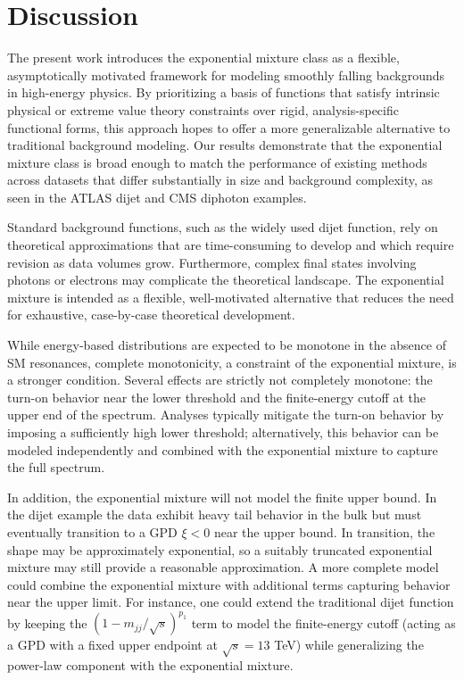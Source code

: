 \documentclass[a4paper,11pt]{article}
\begin{document}
\section{Discussion} \label{sec:discussion}

The present work introduces the exponential mixture class as a flexible, asymptotically motivated framework for modeling smoothly falling backgrounds in high-energy physics. By prioritizing a basis of functions that satisfy intrinsic physical or extreme value theory constraints over rigid, analysis-specific functional forms, this approach hopes to offer a more generalizable alternative to traditional background modeling. Our results demonstrate that the exponential mixture class is broad enough to match the performance of existing methods across datasets that differ substantially in size and background complexity, as seen in the ATLAS dijet and CMS diphoton examples.

Standard background functions, such as the widely used dijet function, rely on theoretical approximations that are time-consuming to develop and which require revision as data volumes grow. Furthermore, complex final states involving photons or electrons may complicate the theoretical landscape. The exponential mixture is intended as a flexible, well-motivated alternative that reduces the need for exhaustive, case-by-case theoretical development.

While energy-based distributions are expected to be monotone in the absence of SM resonances, complete monotonicity, a constraint of the exponential mixture, is a stronger condition.
Several effects are strictly not completely monotone: the turn-on behavior near the lower 
threshold and the finite-energy cutoff at the upper end of the spectrum.
Analyses typically mitigate the turn-on behavior by imposing a sufficiently high lower 
threshold; alternatively, this behavior can be modeled independently and combined with the 
exponential mixture to capture the full spectrum. 

In addition, the exponential mixture will not model the finite upper bound. In the dijet example the data exhibit heavy tail behavior in the bulk but must eventually transition to a GPD $\xi<0$ near the upper bound. In transition, the shape may be approximately exponential, so a suitably truncated exponential 
mixture may still provide a reasonable approximation.
A more complete model could combine the exponential mixture with additional terms capturing 
behavior near the upper limit. For instance, one could extend the traditional dijet function by keeping the $(1-m_{jj}/\sqrt{s})^{p_1}$ term to model the finite-energy cutoff (acting as a GPD with a fixed upper endpoint at $\sqrt{s}=13$ TeV) while generalizing the power-law component with the exponential mixture.
\end{document}
